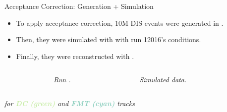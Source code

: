 \begin{frame}{Acceptance Correction: Generation + Simulation}
    \label{11.51::summary}
    \begin{itemize}
        \item
            To apply acceptance correction, 10M DIS events were generated in .

        \item
            Then, they were simulated with  with run 12016's conditions.

        \item
            Finally, they were reconstructed with .
    \end{itemize}

    \vspace{-12pt}

    \begin{columns}[onlytextwidth,T]

    \begin{column}{.05\linewidth}\end{column} %

    \begin{column}{.35\linewidth}
        \begin{center}
            \begin{figure}[t]
                \textit{Run .}
            \end{figure}
        \end{center}
    \end{column}

    \begin{column}{.35\linewidth}
        \begin{center}
            \begin{figure}[t]
                \textit{Simulated data.}
            \end{figure}
        \end{center}
    \end{column}

    \begin{column}{.05\linewidth}\end{column} %

    \end{columns}

    \begin{center}
        \textit{ for \textbf{\textcolor[HTML]{c7eca6}{DC (green)}} and \textbf{\textcolor[HTML]{8dcfbf}{FMT (cyan)}} tracks}
    \end{center}
\end{frame}

